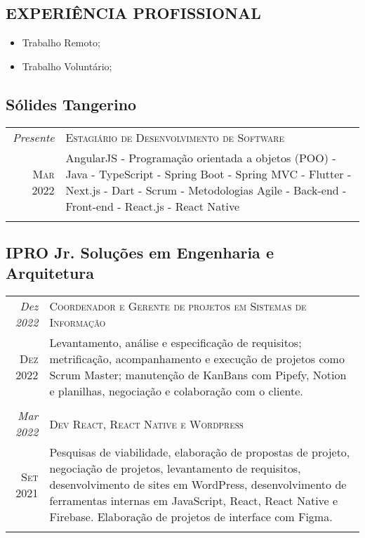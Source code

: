 \begin{framed}
\section{EXPERIÊNCIA PROFISSIONAL}
\begin{itemize}
  \item Trabalho Remoto;
  \item Trabalho Voluntário;

\end{itemize}

\subsection{  Sólides Tangerino}

\begin{tabular}{r|p{15cm}}
\emph{Presente}   & \textsc{Estagiário de Desenvolvimento de Software} \\
\textsc{Mar 2022} & \footnotesize{AngularJS - Programação orientada a objetos (POO) - Java - TypeScript - Spring Boot - Spring MVC - Flutter - Next.js - Dart - Scrum - Metodologias Agile - Back-end - Front-end - React.js - React Native}\\
\multicolumn{2}{c}{}
\end{tabular}


\subsection{  IPRO Jr. Soluções em Engenharia e Arquitetura}

\begin{tabular}{r|p{15cm}}
\emph{Dez 2022}   & \textsc{Coordenador e Gerente de projetos em Sistemas de Informação }\\
\textsc{Dez 2022} & \footnotesize{Levantamento, análise e especificação de requisitos; metrificação, acompanhamento e execução de projetos como Scrum Master; manutenção de KanBans com Pipefy, Notion e planilhas, negociação e colaboração com o cliente.}\\
\multicolumn{2}{c}{}\\

\emph{Mar 2022}   & \textsc{Dev React, React Native e Wordpress }   \\
\textsc{Set 2021} & \footnotesize{Pesquisas de viabilidade, elaboração de propostas de projeto, negociação de projetos, levantamento de requisitos, desenvolvimento de sites em WordPress, desenvolvimento de ferramentas internas em JavaScript, React, React Native e Firebase. Elaboração de projetos de interface com Figma.} \\
\multicolumn{2}{c}{} \\


\end{tabular}
\end{framed}
